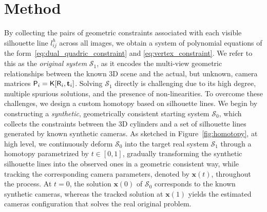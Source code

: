 \section{Method}
\label{sec:method}
By collecting the pairs of geometric constraints associated with each visible silhouette line $l^h_{ij}$ across all images, we obtain a system of polynomial equations of the form~\eqref{eq:dual_quadric_constraint} and \eqref{eq:vertex_constraint}. We refer to this as the \emph{original system} $\mathcal{S}_1$, as it encodes the multi-view geometric relationships between the known 3D scene and the actual, but unknown, camera matrices $\mathsf{P}_i = \mathsf{K}[\mathsf{R}_i, \mathbf{t}_i]$. Solving $\mathcal{S}_1$ directly is  challenging due to its high degree, multiple spurious solutions, and the presence of non-linearities.
To overcome these challenges, we design a custom homotopy based on silhouette lines. We begin by constructing a \emph{synthetic}, geometrically consistent starting system $\mathcal{S}_0$, which collects the constraints between the 3D cylinders and a set of silhouette lines generated by known synthetic cameras. 
As sketched in Figure~\ref{fig:homotopy}, at high level, we  continuously deform $\mathcal{S}_0$ into the target real system $\mathcal{S}_1$ through a homotopy parametrized by $t \in [0,1]$, gradually transforming the synthetic silhouette lines into the observed ones in a geometric consistent way, while tracking the corresponding camera parameters, denoted by $\mathbf{x}(t)$, throughout the process. At $t = 0$, the solution $\mathbf{x}(0)$  of $\mathcal{S}_0$ corresponds to the known synthetic cameras, whereas the tracked solution at $\mathbf{x}(1)$ yields the estimated cameras configuration that solves the real original problem.

